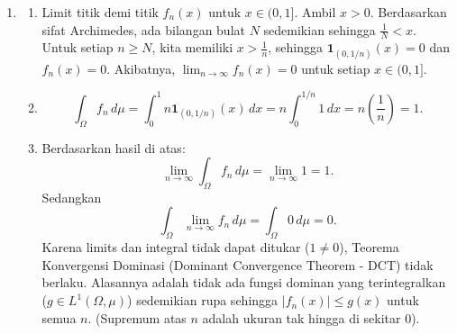 \documentclass{article}
\begin{document}
\begin{enumerate}
  \item
        \begin{enumerate}[label=(\alph*)]
          \item Limit titik demi titik $f_n(x)$ untuk $x \in (0, 1]$. Ambil $x > 0$. Berdasarkan sifat Archimedes, ada bilangan bulat $N$ sedemikian sehingga $\frac{1}{N} < x$. Untuk setiap $n \ge N$, kita memiliki $x > \frac{1}{n}$, sehingga $\mathbf{1}_{(0, 1/n)}(x) = 0$ dan $f_n(x) = 0$. Akibatnya, $\lim_{n \to \infty} f_n(x) = 0$ untuk setiap $x \in (0, 1]$.
          \item
                \[
                  \int_\Omega f_n \, d\mu = \int_0^1 n \mathbf{1}_{(0, 1/n)}(x) \, dx = n \int_0^{1/n} 1 \, dx = n \left(\frac{1}{n}\right) = 1.
                \]
          \item Berdasarkan hasil di atas:
                \[ \lim_{n \to \infty} \int_\Omega f_n \, d\mu = \lim_{n \to \infty} 1 = 1. \]
                Sedangkan
                \[ \int_\Omega \lim_{n \to \infty} f_n \, d\mu = \int_\Omega 0 \, d\mu = 0. \]
                Karena limits dan integral tidak dapat ditukar ($1 \neq 0$), Teorema Konvergensi Dominasi (Dominant Convergence Theorem - DCT) tidak berlaku.
                Alasannya adalah tidak ada fungsi dominan yang terintegralkan ($g \in L^1(\Omega, \mu)$) sedemikian rupa sehingga $|f_n(x)| \le g(x)$ untuk semua $n$. (Supremum atas $n$ adalah ukuran tak hingga di sekitar 0).
        \end{enumerate}
\end{enumerate}
\end{document}
